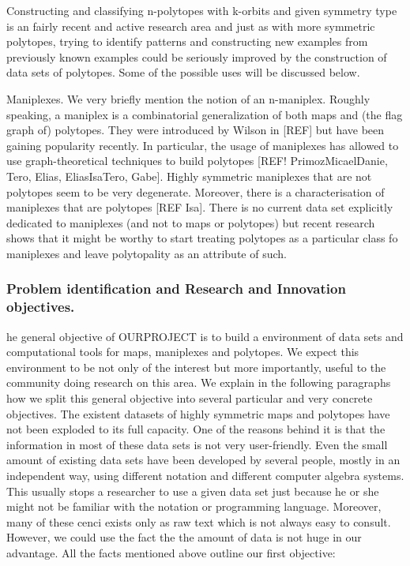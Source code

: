 Constructing and classifying n-polytopes with k-orbits and given symmetry type is an fairly recent and active research area and just as with more symmetric polytopes, trying to identify patterns and  constructing new examples from previously known examples could be seriously improved by the construction of data sets of polytopes.  Some of the possible uses will be discussed below.

Maniplexes. We very briefly mention the notion of an n-maniplex. Roughly speaking, a maniplex is a combinatorial generalization of both maps and (the flag graph of) polytopes. They were introduced by Wilson in [REF] but have been gaining popularity recently. In particular, the usage of maniplexes has allowed to use graph-theoretical techniques to build polytopes [REF! PrimozMicaelDanie, Tero, Elias, EliasIsaTero, Gabe]. Highly symmetric maniplexes that are not polytopes seem to be very degenerate. Moreover, there is a characterisation of maniplexes that are polytopes [REF Isa]. There is no current data set explicitly dedicated to maniplexes (and not to maps or polytopes) but recent research shows that it might be worthy to start treating polytopes as a particular class fo maniplexes and leave polytopality as an attribute of such.


\subsubsection*{Problem identification and Research and Innovation objectives.}

he general objective of OURPROJECT is to build a environment of data sets and computational tools for maps, maniplexes and polytopes. We expect this environment to be not only of the interest but more importantly, useful to the community doing research on this area. We explain in the following paragraphs how we split this general objective into several particular and very concrete objectives.
The existent datasets of highly symmetric maps and polytopes have not been exploded to its full capacity. One of the reasons behind it is that the information in most of these data sets is not very user-friendly. Even the small amount of existing data sets have been developed by several people, mostly in an independent way, using different notation and different computer algebra systems. This usually stops a researcher to use a given data set just because he or she might not be familiar with the notation or programming language. Moreover, many of these cenci exists only as raw text which is not always easy to consult. However, we could use the fact the the amount of data is not huge in our advantage. All the facts mentioned above outline our first objective:

